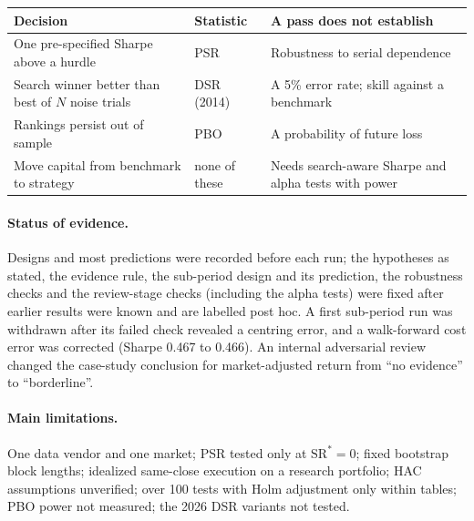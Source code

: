\documentclass[10pt,a4paper]{article}
\begin{document}
\begin{center}\small
\begin{tabular}{@{}lll@{}}
\toprule
Decision & Statistic & A pass does not establish \\
\midrule
One pre-specified Sharpe above a hurdle & PSR & Robustness to serial dependence \\
Search winner better than best of $N$ noise trials & DSR (2014) & A 5\% error rate; skill against a benchmark \\
Rankings persist out of sample & PBO & A probability of future loss \\
Move capital from benchmark to strategy & none of these & Needs search-aware Sharpe and alpha tests with power \\
\bottomrule
\end{tabular}
\end{center}

\paragraph{Status of evidence.} Designs and most predictions were recorded before each run; the hypotheses as stated, the evidence rule, the sub-period design and its prediction, the robustness checks and the review-stage checks (including the alpha tests) were fixed after earlier results were known and are labelled post hoc. A first sub-period run was withdrawn after its failed check revealed a centring error, and a walk-forward cost error was corrected (Sharpe 0.467 to 0.466). An internal adversarial review changed the case-study conclusion for market-adjusted return from ``no evidence'' to ``borderline''.

\paragraph{Main limitations.} One data vendor and one market; PSR tested only at $\mathrm{SR}^\ast=0$; fixed bootstrap block lengths; idealized same-close execution on a research portfolio; HAC assumptions unverified; over 100 tests with Holm adjustment only within tables; PBO power not measured; the 2026 DSR variants not tested.
\end{document}
